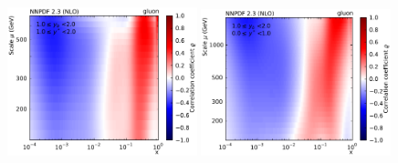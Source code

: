 \begin{figure}[htbp]
    \includegraphics[width=0.49\textwidth]{figures/pdf_constraints/corr_PTMAXEXPYS_YBYS_NLO_FINALBINS_NNPDF23_gluon_ys1_0yb1_0_cl.pdf}\hfill
    \includegraphics[width=0.49\textwidth]{figures/pdf_constraints/corr_PTMAXEXPYS_YBYS_NLO_FINALBINS_NNPDF23_gluon_ys0_0yb0_0_cl.pdf}\hfill
    \caption{}
    \label{fig:pdfconstraints_gluon}
\end{figure}

